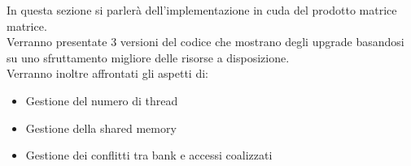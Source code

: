 \documentclass[compress]{beamer}
\begin{document}
\begin{frame}{\secname}
    In questa sezione si parlerà dell'implementazione in cuda del prodotto matrice matrice. \\ 
    
    Verranno presentate 3 versioni del codice che mostrano degli upgrade basandosi su uno sfruttamento migliore delle risorse a disposizione. \\

    Verranno inoltre affrontati gli aspetti di:
    \begin{itemize}
        \item Gestione del numero di thread
        \item Gestione della shared memory
        \item Gestione dei conflitti tra bank e accessi coalizzati
    \end{itemize}
\end{frame}
\end{document}
